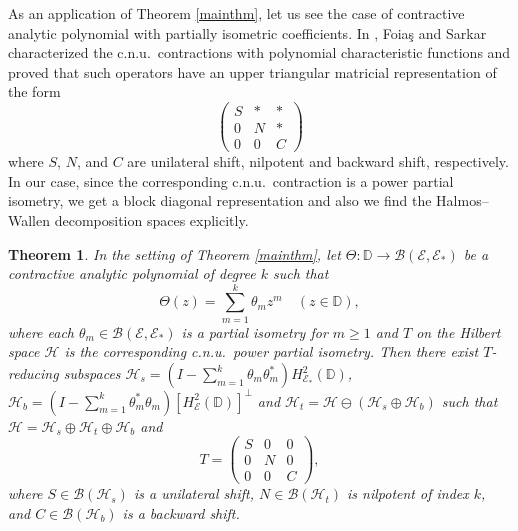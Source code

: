 \documentclass[12pt]{amsart}
\newcommand{\clb}{\mathcal{B}}
\newcommand{\cle}{\mathcal{E}}
\newcommand{\clh}{\mathcal{H}}
\newcommand{\D}{\mathbb{D}}
\theoremstyle{definition}
\theoremstyle{plain}
\newtheorem{thm}{Theorem}[section]
\theoremstyle{definition}
\numberwithin{equation}{section}
\begin{document}
As an application of Theorem \ref{mainthm}, let us see the case of contractive analytic polynomial with partially isometric coefficients. In \cite{foias}, Foia\c{s} and Sarkar characterized the c.n.u.\ contractions with polynomial characteristic functions and proved that such operators have an upper triangular matricial representation of the form 
\[
\begin{pmatrix}
S & * & *\\
0 & N & *\\
0 & 0 & C
\end{pmatrix}
\]
where $S$, $N$, and $C$ are  unilateral shift, nilpotent and backward shift, respectively. In our case, since the corresponding c.n.u.\ contraction is a power partial isometry, we get a block diagonal representation and also we find the Halmos--Wallen decomposition spaces explicitly. 



\begin{thm}{\label{spaces}}
In the setting of Theorem \ref{mainthm}, let $\Theta: \D \rightarrow \clb(\cle,\cle_*)$ be a  contractive analytic polynomial of degree $k$ such that 
\[
\Theta( z)=\sum\limits_{m=1}^k \theta_m z^m \quad (z \in \D),
\]
where each $\theta_m \in \clb(\cle,\cle_*)$ is a partial isometry for $m \geq 1$ and $T$ on the Hilbert space $\clh$ is the corresponding c.n.u.\ power  partial isometry. Then there exist $T$-reducing subspaces $\clh_s= \left(I-\sum\limits_{m=1}^k \theta_m \theta_m^*\right) H^2_{\cle_*}(\D)$, 
$\clh_b = \left(I-\sum\limits_{m=1}^k \theta_m^* \theta_m \right)[H^2_\cle(\D)]^\perp$ and $\clh_t=\clh \ominus (\clh_s \oplus \clh_b)$ such that $\clh=\clh_s \oplus \clh_t \oplus \clh_b$ and 
\[
T=
\begin{pmatrix}
S &0 &0\\
 0&N &0\\
0& 0& C
\end{pmatrix},
\]
where $S \in \clb(\clh_s)$ is a unilateral shift, $N \in \clb(\clh_t)$ is nilpotent of index $k$, and  $C \in \clb(\clh_b)$ is a backward shift.
\end{thm}
\end{document}

